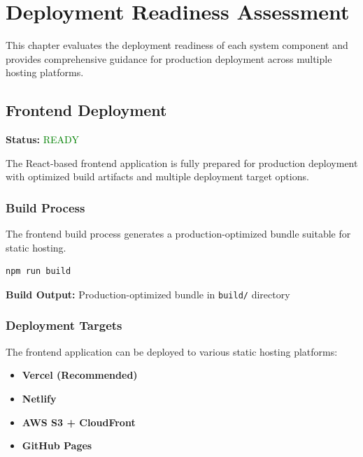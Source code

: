 \chapter{Deployment Readiness Assessment}

This chapter evaluates the deployment readiness of each system component and provides comprehensive guidance for production deployment across multiple hosting platforms.

\section{Frontend Deployment}

\textbf{Status:} \textcolor{green}{READY}

The React-based frontend application is fully prepared for production deployment with optimized build artifacts and multiple deployment target options.

\subsection{Build Process}

The frontend build process generates a production-optimized bundle suitable for static hosting.

\begin{tcolorbox}[colback=gray!10,colframe=black!50,arc=2mm,title=Build Command]
\begin{verbatim}
npm run build
\end{verbatim}
\end{tcolorbox}

\textbf{Build Output:} Production-optimized bundle in \texttt{build/} directory


\subsection{Deployment Targets}

The frontend application can be deployed to various static hosting platforms:

\begin{itemize}
    \item \textbf{Vercel (Recommended)}%
    
    \item \textbf{Netlify} %
    
    \item \textbf{AWS S3 + CloudFront}%
    
    \item \textbf{GitHub Pages} %
\end{itemize}

